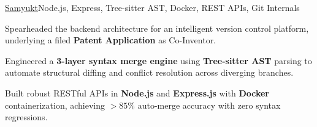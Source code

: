 \begin{cvproject}{\uline{Samyukt}}{Node.js, Express, Tree-sitter AST, Docker, REST APIs, Git Internals}
    \item Spearheaded the backend architecture for an intelligent version control platform, underlying a filed \textbf{Patent Application} as Co-Inventor.
    \item Engineered a \textbf{3-layer syntax merge engine} using \textbf{Tree-sitter AST} parsing to automate structural diffing and conflict resolution across diverging branches.
    \item Built robust RESTful APIs in \textbf{Node.js} and \textbf{Express.js} with \textbf{Docker} containerization, achieving $>85\%$ auto-merge accuracy with zero syntax regressions.
\end{cvproject}
